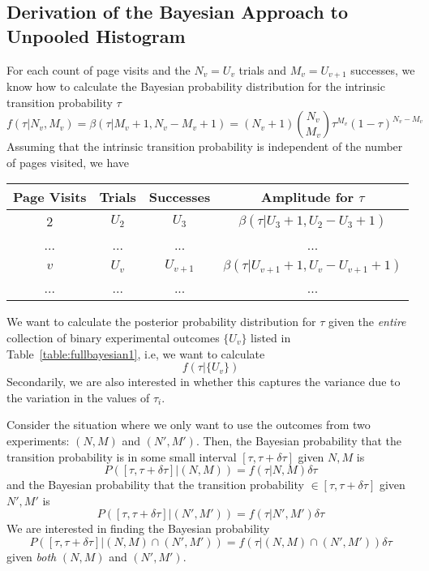 \documentclass[12pt]{report}
\newcommand{\beq}{\begin{equation}} %
\newcommand{\eeq}{\end{equation}} %
\newcommand{\bdm}{\begin{displaymath}} %
\newcommand{\edm}{\end{displaymath}} %
\begin{document}
\subsection{Derivation of the Bayesian Approach to Unpooled Histogram}
\label{sec:BayesUnpooledApp}
For each count of page visits and the \(N_v=U_v\) trials and \(M_v=U_{v+1}\)
successes, we know how to calculate the Bayesian probability
distribution for the intrinsic transition probability \(\tau\)
\beq\label{eq:beta1}
f(\tau|N_v,M_v) =\beta(\tau|M_v+1, N_v-M_v+1) = (N_v+1) {N_v\choose M_v}\tau^{M_v} (1-\tau)^{N_v-M_v}
\eeq
Assuming that the intrinsic transition probability is independent of the
number of pages visited, we have
\begin{center}\label{table:fullbayesian1}
\begin{tabular}{ |c|c|c|c| } 
 \hline
 Page Visits & Trials & Successes & Amplitude for \(\tau\) \\
 \hline
 2 & \(U_2\) & \(U_3\) & \(\beta(\tau|U_3+1, U_2-U_3+1)\)\\
 ... & ... & ... & ... \\ 
 \(v\) & \(U_v\) & \(U_{v+1}\) & \(\beta(\tau|U_{v+1}+1, U_v-U_{v+1}+1)\)\\
 ... & ... & ... & ... \\
 \hline
\end{tabular}
\end{center}

We want to calculate the posterior probability distribution for
\(\tau\) given the {\em entire} collection of binary experimental
outcomes \(\{U_v\}\) listed in Table~\ref{table:fullbayesian1}, i.e,
we want to calculate
\bdm
f(\tau|\{U_v\})
\edm
Secondarily, we are also interested in whether this captures the
variance due to the variation in the values of \(\tau_i\).

Consider the situation where we only want to use the outcomes from two
experiments: \((N,M)\) and \((N', M')\). Then, the Bayesian
probability that the transition probability is in some small interval
\([\tau, \tau+\delta\tau]\) given \(N,M\) is
\bdm
P([\tau, \tau+\delta\tau]|(N,M)) = f(\tau|N,M) \delta\tau
\edm
and the Bayesian probability that the transition probability \(\in
[\tau, \tau+\delta\tau]\) given \(N',M'\) is
\bdm
P([\tau, \tau+\delta\tau]|(N',M')) = f(\tau|N',M') \delta\tau
\edm
We are interested in finding the Bayesian probability
\bdm
P([\tau, \tau+\delta\tau]|(N,M)\cap (N',M'))= f(\tau|(N,M)\cap (N',M'))\delta\tau
\edm
given {\em both} \((N,M)\) and \((N',M')\).
\end{document}
